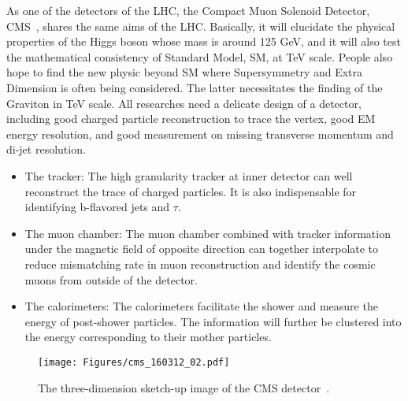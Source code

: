 As one of the detectors of the LHC, the Compact Muon Solenoid Detector, CMS~\citep{CMSDetector}, shares the same aims of the LHC.
Basically, it will elucidate the physical properties of the Higgs boson whose mass is around 125 GeV, and it will also test the mathematical consistency of Standard Model, SM, at TeV scale.
People also hope to find the new physic beyond SM where Supersymmetry and Extra Dimension is often being considered. The latter necessitates the finding of the Graviton in TeV scale.
All researches need a delicate design of a detector, including good charged particle reconstruction to trace the vertex, good EM energy resolution, and good measurement on missing transverse momentum and di-jet resolution.
\begin{itemize}
\item The tracker: The high granularity tracker at inner detector can well reconstruct the trace of charged particles. It is also indispensable for identifying b-flavored jets and $\tau$.  
\item The muon chamber: The muon chamber combined with tracker information under the magnetic field of opposite direction can together interpolate to reduce mismatching rate in muon reconstruction and identify the cosmic muons from outside of the detector.
\item The calorimeters: The calorimeters facilitate the shower and measure the energy of post-shower particles. The information will further be clustered into the energy corresponding to their mother particles.
\end{itemize}

\begin{figure}[t]
  \begin{center}

    \texttt{[image: Figures/cms\_160312\_02.pdf]} 
    \end{center}
  \caption{The three-dimension sketch-up image of the CMS detector~\citep{CMSImage}.}
\end{figure}

